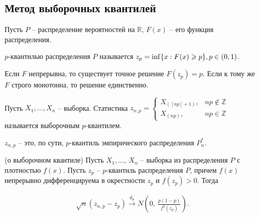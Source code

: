 \subsection*{Метод выборочных квантилей}

Пусть $\displaystyle P$ -- распределение вероятностей на $\displaystyle \mathbb{R}$, $\displaystyle F( x)$ -- его функция распределения.
\begin{definition}
$\displaystyle p$-квантилью распределения $\displaystyle P$ называется $\displaystyle z_{p} =\inf\{x:F( x) \geqslant p\},\\ p \in (0,1)$.
\end{definition}
\begin{note}
Если $\displaystyle F$ непрерывна, то существует точное решение $\displaystyle F( z_{p}) =p$. Если к тому же $\displaystyle F$ строго монотонна, то решение единственно.
\end{note}
\begin{definition}
Пусть $\displaystyle X_{1} ,\dotsc ,X_{n}$ -- выборка. Статистика $\displaystyle z_{n,p} =\begin{cases}
X_{([ np] +1)}, & np\notin \mathbb{Z}\\
X_{( np)}, & np\in \mathbb{Z}
\end{cases}$ называется выборочным $\displaystyle p$-квантилем.
\end{definition}
\begin{note}
$\displaystyle z_{n,p}$ -- это, по сути, $\displaystyle p$-квантиль эмпирического распределения $\displaystyle P_{n}^{*}$.
\end{note}
\begin{theorem}
(о выборочном квантиле) Пусть $\displaystyle X_{1} ,\dotsc ,\ X_{n}$ -- выборка из распределения $\displaystyle P$ с плотностью $\displaystyle f( x)$. Пусть $\displaystyle z_{p}$ -- $\displaystyle p$-квантиль распределения $\displaystyle P$, причем $\displaystyle f( x)$ непрерывно дифференцируема в окрестности $\displaystyle z_{p}$ и $\displaystyle f( z_{p})  >0$. Тогда


\begin{gather*}
\sqrt{n}( z_{n,p} -z_{p})\xrightarrow{d_{\theta }} N\left( 0,\ \frac{p( 1-p)}{f^{2}( z_{p})}\right) .
\end{gather*}
\end{theorem}
